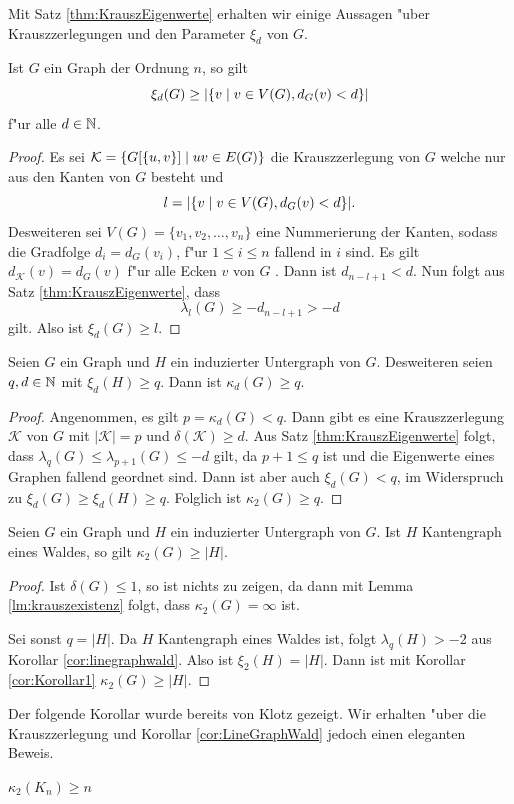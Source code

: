 Mit Satz \ref{thm:KrauszEigenwerte} erhalten wir einige Aussagen "uber Krauszzerlegungen und den Parameter $\xi_{d}$ von $G$.

\begin{corollary}
  Ist $G$ ein Graph der Ordnung $n$, so gilt $$\xi_{d}(G) \geq | \{v \;|\; v\in V(G), d_{G}(v) < d \}|$$
  f"ur alle $d\in {\mathbb{N}}$. 
  \label{cor:xiorderschranke}
\end{corollary}
\begin{proof}
  Es sei $\mathcal{K}= \{G[\{u,v\}] \;|\; uv\in E(G) \}$ die Krauszzerlegung von $G$ welche nur aus den Kanten von $G$ besteht und $$l = |\{v \;|\; v\in V(G), d_{G}(v) < d \}|.$$ 
  Desweiteren sei $V(G) = \{ v_1,v_2,\dots , v_n\}$ eine Nummerierung der Kanten, sodass die Gradfolge $d_i = d_{G}(v_i)$, f"ur $1\leq i \leq n$ fallend in $i$ sind. 
  Es gilt $d_{\mathcal{K}}(v) = d_{G}(v)$ f"ur alle Ecken $v$ von $G$ . Dann ist $d_{n-l+1} < d$. Nun folgt aus Satz \ref{thm:KrauszEigenwerte}, dass
    $$\lambda_{l}(G) \geq - d_{n-l+1} > -d$$
    gilt. Also ist $\xi_{d}(G) \geq l$. 
  \end{proof}

  \begin{corollary}
    \label{cor:Korollar1}
    Seien $G$ ein Graph und $H$ ein induzierter Untergraph von $G$. Desweiteren seien $q,d \in {\mathbb{N}}$ mit $\xi_{d}(H) \geq q$. Dann ist $\kappa_{d}(G) \geq q$.
  \end{corollary}

  \begin{proof}
    Angenommen, es gilt $p = \kappa_{d}(G) < q$. Dann gibt es  eine Krauszzerlegung $\mathcal{K}$ von $G$ mit $|\mathcal{K}| = p$ und $\delta(\mathcal{K}) \geq d$. 
    Aus Satz \ref{thm:KrauszEigenwerte} folgt, dass $\lambda_{q}(G) \leq \lambda_{p+1}(G) \leq -d $ gilt, da $p+1 \leq q$ ist und die Eigenwerte eines Graphen fallend geordnet sind. 
    Dann ist aber auch $\xi_{d}(G) < q$, im Widerspruch zu $\xi_{d}(G) \geq \xi_{d}(H) \geq  q$. Folglich ist $\kappa_2(G) \geq q$.
  \end{proof}

  \begin{corollary}
    \label{cor:LineGraphWald}
    Seien $G$ ein Graph und $H$ ein induzierter Untergraph von $G$. Ist $H$ Kantengraph eines Waldes, so gilt 
    $\kappa_{2}(G)\geq \left|H\right|$.
  \end{corollary}

  \begin{proof}
    Ist $\delta(G) \leq 1$, so ist nichts zu zeigen, da dann mit Lemma \ref{lm:krauszexistenz} folgt, dass $\kappa_2(G) = \infty$ ist.

    Sei sonst $q = |H|$. Da $H$ Kantengraph eines Waldes ist, folgt $\lambda_{q}(H) > -2$ aus Korollar \ref{cor:linegraphwald}. Also ist $\xi_{2}(H) = |H|$.
    Dann ist mit Korollar \ref{cor:Korollar1} $\kappa_{2}\left( G \right) \geq \left| H\right|$.
  \end{proof}
  Der folgende Korollar wurde bereits von Klotz \cite{Klotz89} gezeigt. Wir erhalten "uber die Krauszzerlegung und Korollar \ref{cor:LineGraphWald} jedoch einen eleganten Beweis.
  \begin{corollary}[Klotz]
    $\kappa_{2}\left( K_n \right) \geq n$
  \end{corollary}

